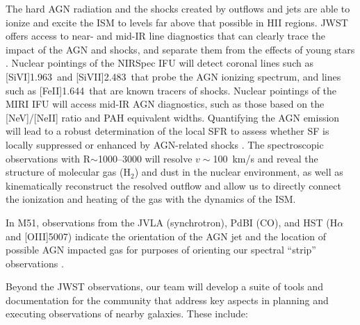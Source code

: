 \documentclass[12pt]{article}
\begin{document}
The hard AGN radiation and the shocks created by outflows and jets are able to ionize and excite the ISM to levels far above that possible in H{\small II} regions.  JWST offers access to near- and mid-IR line diagnostics that can clearly trace the impact of the AGN  and shocks, and separate them from the effects of young stars  \citep{dale2004,dale2009,scharwachter2013,colina2015,smajic2015}. Nuclear pointings of the NIRSpec IFU will detect coronal lines such as [Si{\small VI}]1.963\micron\ and [Si{\small VII}]2.483\micron\ that probe the AGN ionizing spectrum, and lines such as [Fe{\small II}]1.644\micron\ that are known tracers of shocks.  Nuclear pointings of the MIRI IFU will access mid-IR AGN diagnostics, such as those based on the [Ne{\small V}]/[Ne{\small II}] ratio and PAH equivalent widths. Quantifying the AGN emission will lead to a robust determination of the local SFR to assess whether SF is locally suppressed or enhanced by AGN-related shocks  \citep{silk2013}. The spectroscopic observations with R$\sim$1000--3000 will resolve $v \sim$100~km/s and reveal the structure of molecular gas (H$_2$) and dust in the nuclear environment, as well as kinematically reconstruct the resolved outflow and allow us to directly connect the ionization and heating of the gas with the dynamics of the ISM.

In M51, observations from the JVLA (synchrotron), PdBI (CO), and HST (H$\alpha$ and [O{\small III}]5007) indicate the orientation of the AGN jet and the location of possible AGN impacted gas for purposes of orienting our spectral ``strip'' observations \citep{querejeta2016}.  


\medskip
{} Beyond the JWST observations, our team will develop a suite of tools and documentation for the community that address key aspects in planning and executing observations of nearby galaxies. These include:

\vspace{0.05in}
\end{document}

